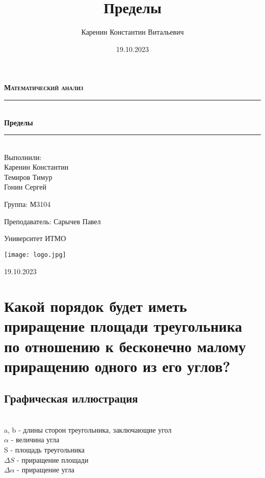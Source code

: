 \documentclass{article}
\title{Пределы}
\author{Каренин Константин Витальевич}
\date{19.10.2023}
\begin{document}
\begin{titlepage}
    \centering
    \vspace*{0.5 cm}
    
    \textsc{\LARGE \textbf{Математический анализ}}
    \vspace{1.5cm}
    
    \rule{\linewidth}{0.2 mm} \\[0.4 cm]
    { \huge \bfseries Пределы}
    \rule{\linewidth}{0.2 mm} \\[1.5 cm]
    
    \Large Выполнили: \\
    Каренин Константин \\
    Темиров Тимур \\
    Гонин Сергей \\
    
    \vspace{0.5cm}
    
    Группа: М3104
    
    \vspace{0.5cm}
    
    Преподаватель: Сарычев Павел
    
    \vspace{0.5cm}
    
    Университет ИТМО
    
    \vfill

    \texttt{[image: logo.jpg]}
    
    19.10.2023
    
\end{titlepage}

\setcounter{page}{2}

\newpage
    \section{Какой порядок будет иметь приращение площади треугольника по отношению к бесконечно малому приращению одного из его углов?}
\subsection{Графическая иллюстрация}
    \\
    \large a, b - длины сторон треугольника, заключающие угол \\
    \large$\alpha$ - величина угла \\
    \large S - площадь треугольника \\
    \large$\Delta S$ - приращение площади \\
    \large$\Delta\alpha$ - приращение угла
\end{document}
